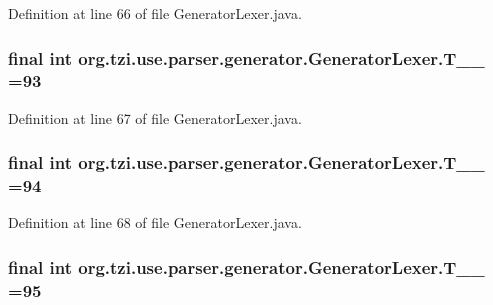 Definition at line 66 of file Generator\-Lexer.\-java.

\hypertarget{classorg_1_1tzi_1_1use_1_1parser_1_1generator_1_1_generator_lexer_a2002b305bb75f8416e103362de0da5cb}{
\subsubsection[{T\-\_\-\-\_\-93}]{\setlength{\rightskip}{0pt plus 5cm}final int org.\-tzi.\-use.\-parser.\-generator.\-Generator\-Lexer.\-T\-\_\-\-\_ =93\hspace{0.3cm}{\ttfamily [static]}}}\label{classorg_1_1tzi_1_1use_1_1parser_1_1generator_1_1_generator_lexer_a2002b305bb75f8416e103362de0da5cb}


Definition at line 67 of file Generator\-Lexer.\-java.

\hypertarget{classorg_1_1tzi_1_1use_1_1parser_1_1generator_1_1_generator_lexer_a52126adaf8efc47c819ad5d005362553}{
\subsubsection[{T\-\_\-\-\_\-94}]{\setlength{\rightskip}{0pt plus 5cm}final int org.\-tzi.\-use.\-parser.\-generator.\-Generator\-Lexer.\-T\-\_\-\-\_ =94\hspace{0.3cm}{\ttfamily [static]}}}\label{classorg_1_1tzi_1_1use_1_1parser_1_1generator_1_1_generator_lexer_a52126adaf8efc47c819ad5d005362553}


Definition at line 68 of file Generator\-Lexer.\-java.

\hypertarget{classorg_1_1tzi_1_1use_1_1parser_1_1generator_1_1_generator_lexer_a7dd8bface6c6cb7a5938729ec19c1ec8}{
\subsubsection[{T\-\_\-\-\_\-95}]{\setlength{\rightskip}{0pt plus 5cm}final int org.\-tzi.\-use.\-parser.\-generator.\-Generator\-Lexer.\-T\-\_\-\-\_ =95\hspace{0.3cm}{\ttfamily [static]}}}\label{classorg_1_1tzi_1_1use_1_1parser_1_1generator_1_1_generator_lexer_a7dd8bface6c6cb7a5938729ec19c1ec8}


